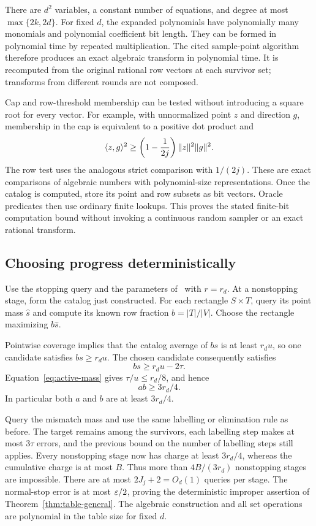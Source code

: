There are $d^2$ variables, a constant number of equations, and degree at most $\max\{2k,2d\}$. For fixed $d$, the expanded polynomials have polynomially many monomials and polynomial coefficient bit length. They can be formed in polynomial time by repeated multiplication. The cited sample-point algorithm therefore produces an exact algebraic transform in polynomial time. It is recomputed from the original rational row vectors at each survivor set; transforms from different rounds are not composed.

Cap and row-threshold membership can be tested without introducing a square root for every vector. For example, with unnormalized point $z$ and direction $g$, membership in the cap is equivalent to a positive dot product and
\[
 \langle z,g\rangle^2\ge\left(1-\frac1{2j}\right)\lVert z\rVert^2\lVert g\rVert^2.
\]
The row test uses the analogous strict comparison with $1/(2j)$. These are exact comparisons of algebraic numbers with polynomial-size representations. Once the catalog is computed, store its point and row subsets as bit vectors. Oracle predicates then use ordinary finite lookups. This proves the stated finite-bit computation bound without invoking a continuous random sampler or an exact rational transform.

\subsection{Choosing progress deterministically}
Use the stopping query and the parameters of \Rectify\ with $r=r_d$. At a nonstopping stage, form the catalog just constructed. For each rectangle $S\times T$, query its point mass $\hat s$ and compute its known row fraction $b=|T|/|V|$. Choose the rectangle maximizing $b\hat s$.

Pointwise coverage implies that the catalog average of $bs$ is at least $r_du$, so one candidate satisfies $bs\ge r_du$. The chosen candidate consequently satisfies
\[
 bs\ge r_du-2\tau.
\]
Equation~\eqref{eq:active-mass} gives $\tau/u\le r_d/8$, and hence
\begin{equation}
 ab\ge3r_d/4.
\label{eq:detprogress}
\end{equation}
In particular both $a$ and $b$ are at least $3r_d/4$.

Query the mismatch mass and use the same labelling or elimination rule as before. The target remains among the survivors, each labelling step makes at most $3\tau$ errors, and the previous bound on the number of labelling steps still applies. Every nonstopping stage now has charge at least $3r_d/4$, whereas the cumulative charge is at most $B$. Thus more than $4B/(3r_d)$ nonstopping stages are impossible. There are at most $2J_j+2=O_d(1)$ queries per stage. The normal-stop error is at most $\varepsilon/2$, proving the deterministic improper assertion of Theorem~\ref{thm:table-general}. The algebraic construction and all set operations are polynomial in the table size for fixed $d$.

